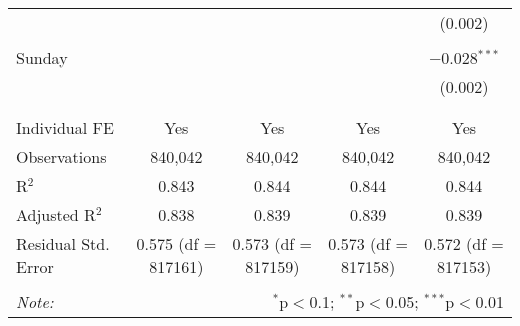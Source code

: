 \documentclass[
]{article}
\begin{document}
\begin{table}[!htbp]
{\begin{tabular}{@{\extracolsep{5pt}}lcccc}
  &  &  &  & (0.002) \\ 
  & & & & \\ 
 Sunday &  &  &  & $-$0.028$^{***}$ \\ 
  &  &  &  & (0.002) \\ 
  & & & & \\ 
\hline \\[-1.8ex] 
Individual FE & Yes & Yes & Yes & Yes \\ 
Observations & 840,042 & 840,042 & 840,042 & 840,042 \\ 
R$^{2}$ & 0.843 & 0.844 & 0.844 & 0.844 \\ 
Adjusted R$^{2}$ & 0.838 & 0.839 & 0.839 & 0.839 \\ 
Residual Std. Error & 0.575 (df = 817161) & 0.573 (df = 817159) & 0.573 (df = 817158) & 0.572 (df = 817153) \\ 
\hline 
\hline \\[-1.8ex] 
\textit{Note:}  & \multicolumn{4}{r}{$^{*}$p$<$0.1; $^{**}$p$<$0.05; $^{***}$p$<$0.01} \\ 
\end{tabular}
} 
\end{table} 
\newpage
\end{document}
